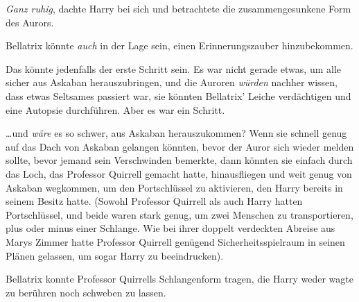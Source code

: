 \emph{Ganz ruhig}, dachte Harry bei sich und betrachtete die zusammengesunkene Form des Aurors.

Bellatrix könnte \emph{auch} in der Lage sein, einen Erinnerungszauber hinzubekommen.

Das könnte jedenfalls der erste Schritt sein. Es war nicht gerade etwas, um alle sicher aus Askaban herauszubringen, und die Auroren \emph{würden} nachher wissen, dass etwas Seltsames passiert war, sie könnten Bellatrix’ Leiche verdächtigen und eine Autopsie durchführen. Aber es war ein Schritt.

…und \emph{wäre} es so schwer, aus Askaban herauszukommen? Wenn sie schnell genug auf das Dach von Askaban gelangen könnten, bevor der Auror sich wieder melden sollte, bevor jemand sein Verschwinden bemerkte, dann könnten sie einfach durch das Loch, das Professor Quirrell gemacht hatte, hinausfliegen und weit genug von Askaban wegkommen, um den Portschlüssel zu aktivieren, den Harry bereits in seinem Besitz hatte. (Sowohl Professor Quirrell als auch Harry hatten Portschlüssel, und beide waren stark genug, um zwei Menschen zu transportieren, plus oder minus einer Schlange. Wie bei ihrer doppelt verdeckten Abreise aus Marys Zimmer hatte Professor Quirrell genügend Sicherheitsspielraum in seinen Plänen gelassen, um sogar Harry zu beeindrucken).

Bellatrix konnte Professor Quirrells Schlangenform tragen, die Harry weder wagte zu berühren noch schweben zu lassen.

